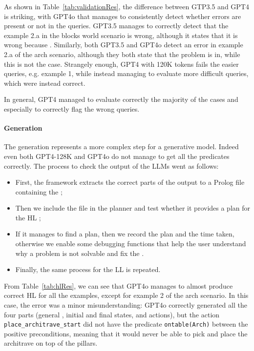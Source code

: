 As shown in Table~\ref{tab:validationRes}, the difference between GTP3.5 and GPT4 is striking, with GPT4o that manages to consistently detect whether errors are present or not in the queries.
GPT3.5 manages to correctly detect that the example 2.a in the blocks world scenario is wrong, although it states that it is wrong because . Similarly, both GPT3.5 and GPT4o detect an error in example 2.a of the arch scenario, although they both state that the problem is in, while this is not the case. 
Strangely enough, GPT4 with 120K tokens fails the easier queries, e.g. example 1, while instead managing to evaluate more difficult queries, which were instead correct. 

In general, GPT4 managed to evaluate correctly the majority of the cases and especially to correctly flag the wrong queries. 

\paragraph{\kb Generation} 

The \kb generation represents a more complex step for a generative model. Indeed even both GPT4-128K and GPT4o do not manage to get all the predicates correctly. The process to check the output of the LLMs went as follows:
\begin{itemize}
    \item First, the framework extracts the correct parts of the output to a Prolog file containing the \kb;
    \item Then we include the file in the planner and test whether it provides a plan for the HL \kb;
    \item If it manages to find a plan, then we record the plan and the time taken, otherwise we enable some debugging functions that help the user understand why a problem is not solvable and fix the \kb.
    \item Finally, the same process for the LL \kb is repeated.
\end{itemize}

From Table~\ref{tab:hlRes}, we can see that GPT4o manages to almost produce correct HL \kbases for all the examples, except for example 2 of the arch scenario. In this case, the error was a minor misunderstanding: GPT4o correctly generated all the four parts (general \kb, initial and final states, and actions), but the action \verb|place_architrave_start| did not have the predicate \verb|ontable(Arch)| between the positive preconditions, meaning that it would never be able to pick and place the architrave on top of the pillars.

